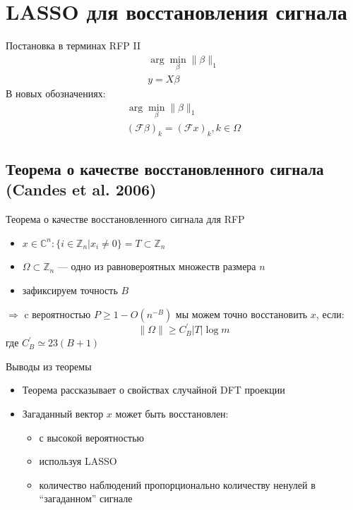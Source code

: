 \documentclass[14pt, fleqn, xcolor={dvipsnames, table}]{beamer}
\begin{document}
\section{LASSO для восстановления сигнала}
\begin{frame}{Постановка в терминах RFP II}
  $$\begin{array}{l}
  \arg \min_\beta\|\beta\|_1\\
  y = X\beta
  \end{array}$$
 В новых обозначениях:
$$\begin{array}{l}
\arg \min_\beta \|\beta\|_1 \\
(\mathcal{F}\beta)_k = (\mathcal{F}x)_k, k \in \Omega
\end{array}$$
\end{frame}

\subsection{Теорема о качестве восстановленного сигнала (Candes et al. 2006)}
\begin{frame}{Теорема о качестве восстановленного сигнала для RFP}
\small
\begin{theorem}[Candes et al. (2006)]
\begin{itemize}
\item[] $x\in\mathbb{C}^n : \{i \in \mathbb{Z}_n|x_i \ne 0\} = T \subset \mathbb{Z}_n$ 
\item[] $\Omega \subset \mathbb{Z}_n$ --- одно из равновероятных множеств размера $n$
\item[] зафиксируем точность $B$
\end{itemize}
$\Rightarrow$ c вероятностью $P \ge 1 - O(n^{-B})$ мы можем точно восстановить $x$, если:
$$
\|\Omega\| \ge C^{'}_B|T|\log m
$$
где $C^{'}_B \simeq 23(B + 1)$
\end{theorem}
\end{frame}

\begin{frame}{Выводы из теоремы}
\begin{itemize}
  \item Теорема рассказывает о свойствах случайной DFT проекции
  \item Загаданный вектор $x$ может быть восстановлен:
  \begin{itemize}
    \item с высокой вероятностью
    \item используя LASSO
    \item количество наблюдений пропорционально количеству ненулей в ``загаданном'' сигнале
  \end{itemize}
\end{itemize}
\end{frame}
\end{document}
